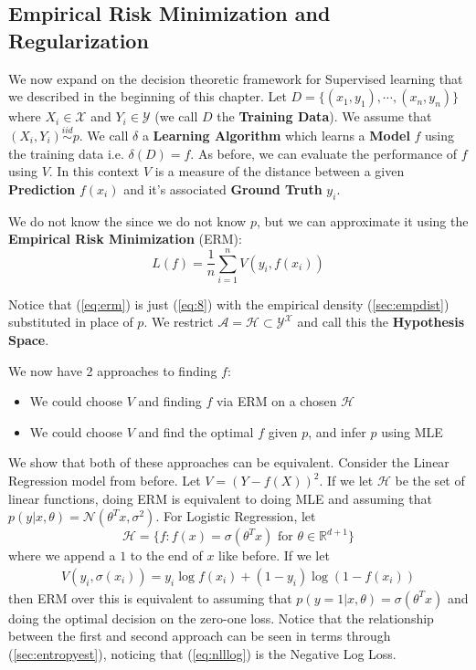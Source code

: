 \documentclass[]{article}
\theoremstyle{mattstyle}
\theoremstyle{definition}
\begin{document}
\newpage

\subsection{Empirical Risk Minimization and Regularization}

We now expand on the decision theoretic framework for Supervised learning that we described in the beginning of this chapter. Let $D=\{(x_1,y_1), \cdots, (x_n,y_n)\}$ where $X_i \in \mathcal{X}$ and $Y_i \in \mathcal{Y}$ (we call $D$ the \textbf{Training Data}). We assume that  $(X_i,Y_i) \overset{iid}{\sim} p$.
We call \(\delta\) a \textbf{Learning Algorithm} which learns a \textbf{Model} $f$ using the training data i.e. $\delta(D) = f$. As before, we can evaluate the performance of $f$ using $V$. In this context $V$ is a measure of the distance between a given \textbf{Prediction} $f(x_i)$ and it’s associated \textbf{Ground Truth} $y_i$.

We do not know the  since we do not know $p$, but we can approximate it using the \textbf{Empirical Risk Minimization} (ERM):
\begin{equation}\label{eq:erm}
L(f) = \frac{1}{n}\sum_{i=1}^n V\left(y_i,f(x_i)\right)
\end{equation}

Notice that (\ref{eq:erm}) is just (\ref{eq:8}) with the empirical density (\ref{sec:empdist}) substituted in place of $p$. We restrict $\mathcal{A}=\mathcal{H} \subset \mathcal{Y}^\mathcal{X}$ and call this the \textbf{Hypothesis Space}.

We now have 2 approaches to finding $f$:
\begin{itemize}
	\item We could choose $V$ and finding $f$ via ERM on a chosen $\mathcal{H}$
	\item We could choose $V$ and find the optimal $f$ given $p$, and infer $p$ using MLE
\end{itemize}
We show that both of these approaches can be equivalent. Consider the Linear Regression model from before. Let $V=(Y-f(X))^2$. If we let $\mathcal{H}$ be the set of linear functions, doing ERM is equivalent to doing MLE and assuming that $p(y|x, \theta) =\mathcal{N}(\theta^Tx,\sigma^2)$. For Logistic Regression, let $$\mathcal{H} = \{f : f(x)=\sigma(\theta^Tx) \text{ for } \theta\in\mathbb{R}^{d+1} \}$$ where we append a $1$ to the end of $x$ like before. If we let 
\begin{align}\label{eq:nlllog}
V(y_i,\sigma(x_i))=y_i \log f(x_i) + (1-y_i)\log (1-f(x_i))
\end{align}
then ERM over this is equivalent to assuming that $p(y=1|x, \theta) = \sigma(\theta^Tx)$ and doing the optimal decision on the zero-one loss. Notice that the relationship between the first and second approach can be seen in terms through (\ref{sec:entropyest}), noticing that (\ref{eq:nlllog}) is the Negative Log Loss.
\end{document}
